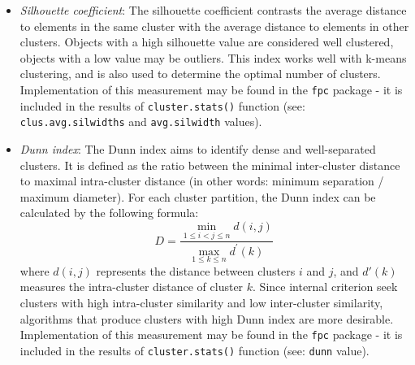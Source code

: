 \documentclass[10pt]{article}\usepackage[]{graphicx}\usepackage[]{color}
\begin{document}
\begin{itemize}
\item \textit{Silhouette coefficient}:
\newline \newline The silhouette coefficient contrasts the average distance to elements in the same cluster with the average distance to elements in other clusters. Objects with a high silhouette value are considered well clustered, objects with a low value may be outliers. This index works well with k-means clustering, and is also used to determine the optimal number of clusters. 
\newline \newline
Implementation of this measurement may be found in the \texttt{fpc} package - it is included 
in the results of  \texttt{cluster.stats()} function (see: \texttt{clus.avg.silwidths} and \texttt{avg.silwidth} values). 

\item \textit{Dunn index}:
\newline \newline The Dunn index aims to identify dense and well-separated clusters. 
It is defined as the ratio between the minimal inter-cluster distance to maximal intra-cluster distance (in other words: minimum separation / maximum diameter). 
For each cluster partition, the Dunn index can be calculated by the following formula: 
$$D = \frac{\min_{1 \leq i < j \leq n} d(i,j)}{\max_{1 \leq k \leq n} d^{\prime}(k)} \,$$ 
where $d(i,j)$ represents the distance between clusters $i$ and $j$, and $d'(k)$ measures the intra-cluster distance of cluster $k$. 
\newline \newline
Since internal criterion seek clusters with high intra-cluster similarity and low inter-cluster similarity, algorithms that produce clusters with high Dunn index are more desirable.
\newline \newline
Implementation of this measurement may be found in the \texttt{fpc} package - it is included 
in the results of  \texttt{cluster.stats()} function (see: \texttt{dunn} value). 



\end{itemize}
\end{document}
